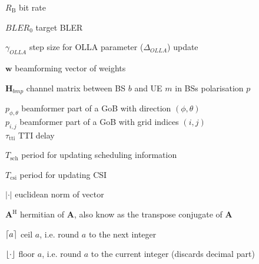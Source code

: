 $R_\text{B}$ \mytab bit rate %

$BLER_\text{0}$ \mytab target \ac{BLER}

$\gamma_{OLLA}$ \mytab step size for OLLA parameter ($\Delta_{OLLA}$) update

$\bm{w}$ \mytab beamforming vector of weights

$\bm{H}_{bmp}$ \mytab channel matrix between BS $b$ and UE $m$ in BSs polarisation $p$

$p_{\phi, \theta}$ \mytab beamformer part of a GoB with direction $(\phi, \theta)$ \\
$p_{i,j}$ \mytab beamformer part of a GoB with grid indices $(i,j)$\\


$\tau_\text{tti}$   \mytab TTI delay 


$T_\text{sch}$  \mytab period for updating scheduling information

$T_\text{csi}$  \mytab period for updating \ac{CSI}



$|\cdot|$ \mytab euclidean norm of vector

$\bm{A}^\text{H}$ \mytab hermitian of $\bm{A}$, also know as the transpose conjugate of $\bm{A}$

$\lceil a\rceil$ \mytab ceil $a$, i.e. round $a$ to the next integer

$\lfloor\cdot\rfloor$ \mytab floor $a$, i.e. round $a$ to the current integer (discards decimal part)


\clearpage
\thispagestyle{empty}


\cleardoublepage
 \setcounter{page}{1}
\baselineskip 18pt